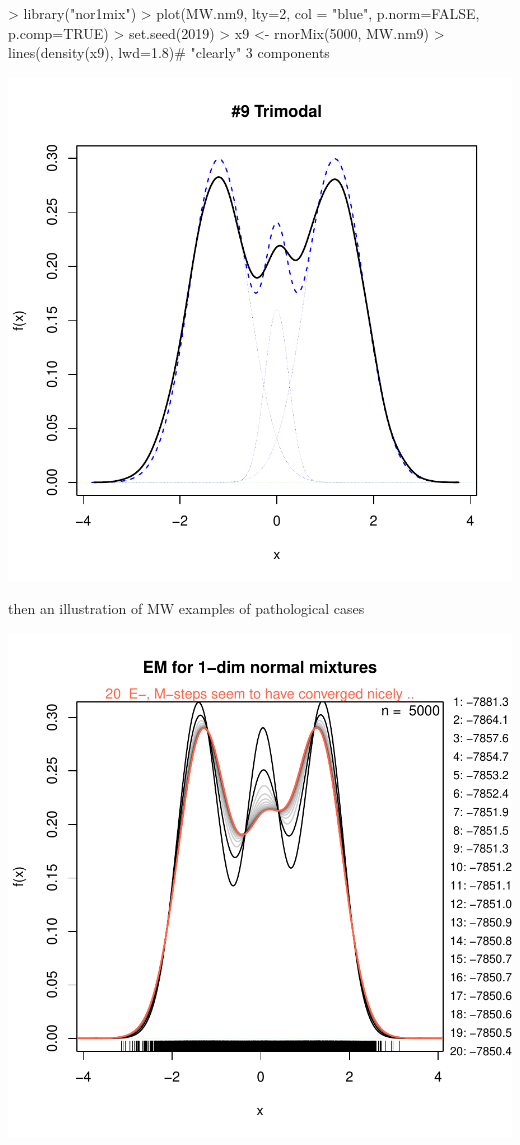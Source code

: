\begin{Schunk}
\begin{Sinput}
> library("nor1mix")
> plot(MW.nm9, lty=2, col = "blue", p.norm=FALSE, p.comp=TRUE)
> set.seed(2019)
> x9 <- rnorMix(5000, MW.nm9)
> lines(density(x9), lwd=1.8)# "clearly" 3 components
\end{Sinput}
\end{Schunk}
\includegraphics{chapter1-001}


then an illustration of MW examples of pathological cases


\includegraphics{chapter1-002}


